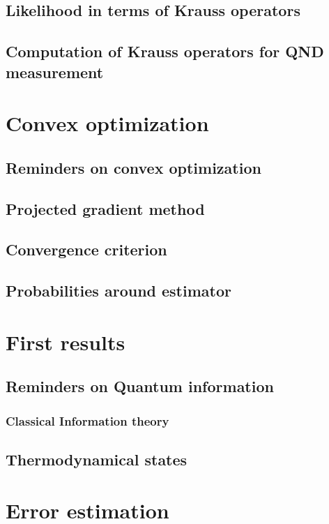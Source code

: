 \documentclass[10pt]{report}
\begin{document}
\section{Likelihood in terms of Krauss operators}
\section{Computation of Krauss operators for QND measurement}

\chapter{Convex optimization}
\section{Reminders on convex optimization}
\section{Projected gradient method}
\section{Convergence criterion}
\section{Probabilities around estimator}

\chapter{First results}
\section{Reminders on Quantum information}
\subsection{Classical Information theory}

\section{Thermodynamical states}


\chapter{Error estimation}
\end{document}
